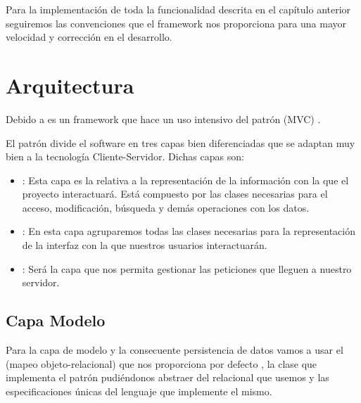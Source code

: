 
Para la implementación de toda la funcionalidad descrita en el capítulo anterior
seguiremos las convenciones que el framework  nos
proporciona para una mayor velocidad y corrección en el desarrollo.

\section{Arquitectura}

\label{pattern:mvc}
Debido a  es un framework que hace un uso intensivo del
patrón  (MVC) \cite{agilerails}.

El patrón  divide el software en tres capas
bien diferenciadas que se adaptan muy bien a la tecnología
Cliente-Servidor. Dichas capas son:

\begin{itemize}
\item {}: Esta capa es la relativa a la representación de la
  información con la que el proyecto interactuará. Está compuesto por las clases
  necesarias para el acceso, modificación, búsqueda y demás operaciones con los
  datos.
\item {}: En esta capa agruparemos todas las clases necesarias para
  la representación de la interfaz con la que nuestros usuarios interactuarán.
\item {}: Será la capa que nos permita gestionar las
  peticiones que lleguen a nuestro servidor.
\end{itemize}

\subsection{Capa Modelo}

Para la capa de modelo y la consecuente persistencia de datos vamos a usar el
 (mapeo objeto-relacional) que nos proporciona por defecto
, la clase  que implementa el
patrón  pudiéndonos abstraer del 
relacional que usemos y las especificaciones únicas del lenguaje 
que implemente el mismo.

